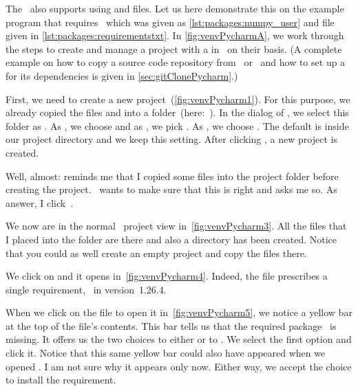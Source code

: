 %
The  \pycharm\ also supports using  and  files.
Let us here demonstrate this on the example program that requires \numpy\ which was given as \cref{lst:packages:numpy_user} and  file given in \cref{lst:packages:requirementstxt}.
In \cref{fig:venvPycharmA}, we work through the steps to create and manage a project with a  in \pycharm\ on their basis.
(A complete example on how to copy a source code repository from \git\ or \github\ and how to set up a  for its dependencies is given in \cref{sec:gitClonePycharm}.)

First, we need to create a new project~(\cref{fig:venvPycharm1}).
For this purpose, we already copied the files  and  into a folder~(here:~).
In the  dialog of \pycharm, we select this folder as .
As , we choose  and as , we pick .
As , we choose .
The default  is  inside our project directory and we keep this setting.
After clicking , a new project is created.

Well, almost:
 reminds me that I copied some files into the project folder before creating the project.
\pycharm\ wants to make sure that this is right and asks me so.
As answer, I click~.

We now are in the normal \pycharm\ project view in~\cref{fig:venvPycharm3}.
All the files that I placed into the folder are there and also a  directory has been created.
Notice that you could as well create an empty project and copy the files there.

We click on  and it opens in~\cref{fig:venvPycharm4}.
Indeed, the file prescribes a single requirement, \numpy\ in version~1.26.4.

When we click on the file  to open it in~\cref{fig:venvPycharm5}, we notice a yellow bar at the top of the file's contents.
This bar tells us that the required package \numpy\ is missing.
It offers us the two choices to either  or to .
We select the first option and click it.
Notice that this same yellow bar could also have appeared when we opened .
I am not sure why it appears only now.
Either way, we accept the choice to install the requirement.

